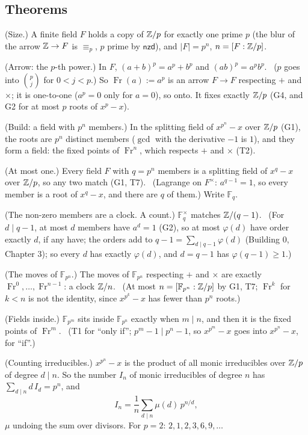 \subsection*{Theorems}

\begin{lines}
\item[\lab{T1}] (Size.) A finite field $F$ holds a copy of $\mathbb{Z}/p$ for exactly one prime $p$ (the blur of the arrow $\mathbb{Z} \to F$ is $\equiv_p$, $p$ prime by $\mathsf{nzd}$), and $|F| = p^n$, $n = [F : \mathbb{Z}/p]$.
\item[\lab{T2}] (Arrow: the $p$-th power.) In $F$, $(a + b)^p = a^p + b^p$ and $(ab)^p = a^p b^p$. \ ($p$ goes into $\binom{p}{j}$ for $0 < j < p$.) So $\operatorname{Fr}(a) := a^p$ is an arrow $F \to F$ respecting $+$ and $\times$; it is one-to-one ($a^p = 0$ only for $a = 0$), so onto. It fixes exactly $\mathbb{Z}/p$ (G4, and G2 for at most $p$ roots of $x^p - x$).
\item[\lab{T3}] (Build: a field with $p^n$ members.) In the splitting field of $x^{p^n} - x$ over $\mathbb{Z}/p$ (G1), the roots are $p^n$ distinct members ($\gcd$ with the derivative $-1$ is $1$), and they form a field: the fixed points of $\operatorname{Fr}^n$, which respects $+$ and $\times$ (T2).
\item[\lab{T4}] (At most one.) Every field $F$ with $q = p^n$ members is a splitting field of $x^q - x$ over $\mathbb{Z}/p$, so any two match (G1, T7). \ (Lagrange on $F^\times$: $a^{q-1} = 1$, so every member is a root of $x^q - x$, and there are $q$ of them.) Write $\mathbb{F}_q$.
\item[\lab{T5}] (The non-zero members are a clock. A count.) $\mathbb{F}_q^\times$ matches $\mathbb{Z}/(q - 1)$. \ (For $d \mid q - 1$, at most $d$ members have $a^d = 1$ (G2), so at most $\varphi(d)$ have order exactly $d$, if any have; the orders add to $q - 1 = \sum_{d \mid q - 1} \varphi(d)$ (Building 0, Chapter 3); so every $d$ has exactly $\varphi(d)$, and $d = q - 1$ has $\varphi(q - 1) \ge 1$.)
\item[\lab{T6}] (The moves of $\mathbb{F}_{p^n}$.) The moves of $\mathbb{F}_{p^n}$ respecting $+$ and $\times$ are exactly $\operatorname{Fr}^0, \dots, \operatorname{Fr}^{n-1}$: a clock $\mathbb{Z}/n$. \ (At most $n = [\mathbb{F}_{p^n} : \mathbb{Z}/p]$ by G1, T7; $\operatorname{Fr}^k$ for $k < n$ is not the identity, since $x^{p^k} - x$ has fewer than $p^n$ roots.)
\item[\lab{T7}] (Fields inside.) $\mathbb{F}_{p^m}$ sits inside $\mathbb{F}_{p^n}$ exactly when $m \mid n$, and then it is the fixed points of $\operatorname{Fr}^m$. \ (T1 for ``only if''; $p^m - 1 \mid p^n - 1$, so $x^{p^m} - x$ goes into $x^{p^n} - x$, for ``if''.)
\item[\lab{T8}] (Counting irreducibles.) $x^{p^n} - x$ is the product of all monic irreducibles over $\mathbb{Z}/p$ of degree $d \mid n$. So the number $I_n$ of monic irreducibles of degree $n$ has $\sum_{d \mid n} d\, I_d = p^n$, and \[ I_n = \frac1n \sum_{d \mid n} \mu(d)\, p^{n/d} , \] $\mu$ undoing the sum over divisors. For $p = 2$: $2, 1, 2, 3, 6, 9, \dots$
\end{lines}

